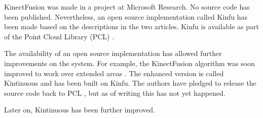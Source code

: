 

KinectFusion was made in a project at Microsoft Research. No source code has been published. Nevertheless, an open source implementation called Kinfu has been made based on the descriptions in the two articles. Kinfu is available as part of the Point Cloud Library (PCL) \citep{PCL}.

The availability of an open source implementation has allowed further improvements on the system. For example, the KinectFusion algorithm was soon improved to work over extended areas \citep{Whelan12rssw}. The enhanced version is called Kintinuous and has been built on Kinfu. The authors have pledged to release the source code back to PCL , but as of writing this has not yet happened.


Later on, Kintinuous has been further improved. 
\citep{Whelan12tr}

